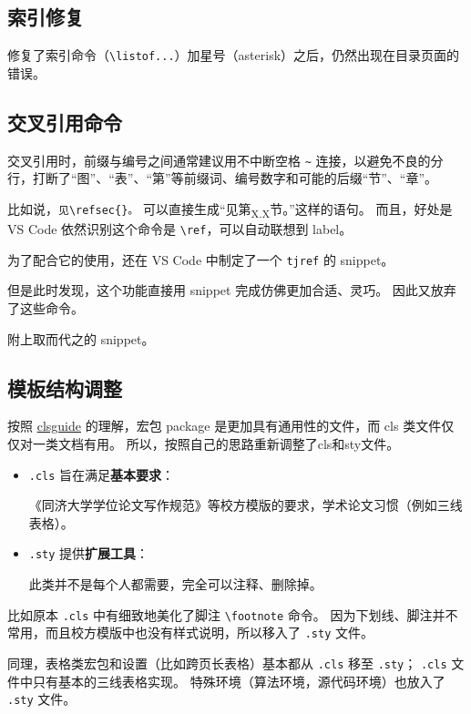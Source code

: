 \documentclass[../Main/thesis.tex]{subfiles}
\begin{document}
\subsection{索引修复}

修复了索引命令（\texttt{\textbackslash{}listof...}）加星号（asterisk）之后，仍然出现在目录页面的错误。

\subsection{交叉引用命令}

交叉引用时，前缀与编号之间通常建议用不中断空格
\texttt{\textasciitilde{}}
连接，以避免不良的分行，打断了``图''、``表''、``第''等前缀词、编号数字和可能的后缀``节''、``章''。

比如说，\texttt{见\textbackslash{}refsec\{\}。}
可以直接生成``见第\textsubscript{X.X}节。''这样的语句。 而且，好处是 VS Code 依然识别这个命令是 \texttt{\textbackslash{}ref}，可以自动联想到 label。

为了配合它的使用，还在 VS Code 中制定了一个 \texttt{tjref} 的 snippet。

但是此时发现，这个功能直接用 snippet 完成仿佛更加合适、灵巧。
因此又放弃了这些命令。

附上取而代之的 snippet。

\subsection{模板结构调整}

按照 \href{http://texdoc.net/texmf-dist/doc/latex/base/clsguide.pdf}{clsguide}
的理解，宏包 package 是更加具有通用性的文件，而 cls
类文件仅仅对一类文档有用。 所以，按照自己的思路重新调整了cls和sty文件。

\begin{itemize}
\item
  \texttt{.cls} 旨在满足\textbf{基本要求}：

  《同济大学学位论文写作规范》等校方模版的要求，学术论文习惯（例如三线表格）。
\item
  \texttt{.sty} 提供\textbf{扩展工具}：

  此类并不是每个人都需要，完全可以注释、删除掉。
\end{itemize}

比如原本 \texttt{.cls} 中有细致地美化了脚注
\texttt{\textbackslash{}footnote} 命令。
因为下划线、脚注并不常用，而且校方模版中也没有样式说明，所以移入了
\texttt{.sty} 文件。

同理，表格类宏包和设置（比如跨页长表格）基本都从 \texttt{.cls} 移至
\texttt{.sty}； \texttt{.cls} 文件中只有基本的三线表格实现。
特殊环境（算法环境，源代码环境）也放入了 \texttt{.sty} 文件。
\end{document}

